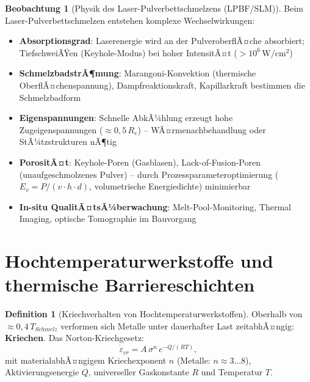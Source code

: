 ﻿\documentclass[a4paper,12pt]{report}
\theoremstyle{definition}
\newtheorem{definition}{Definition}
\newtheorem{beobachtung}{Beobachtung}
\begin{document}
\begin{beobachtung}[Physik des Laser-Pulverbettschmelzens (LPBF/SLM)]
Beim Laser-Pulverbettschmelzen entstehen komplexe Wechselwirkungen:
\begin{itemize}
    \item[-] \textbf{Absorptionsgrad}: Laserenergie wird an der PulveroberflÃ¤che
          absorbiert; TiefschweiÃŸen (Keyhole-Modus) bei hoher IntensitÃ¤t ($> 10^6\,\mathrm{W/cm^2}$)
    \item[-] \textbf{SchmelzbadstrÃ¶mung}: Marangoni-Konvektion (thermische OberflÃ¤chenspannung),
          Dampfreaktionskraft, Kapillarkraft bestimmen die Schmelzbadform
    \item[-] \textbf{Eigenspannungen}: Schnelle AbkÃ¼hlung erzeugt hohe Zugeigenspannungen
          ($\approx 0{,}5\,R_e$) -- WÃ¤rmenachbehandlung oder StÃ¼tzstrukturen nÃ¶tig
    \item[-] \textbf{PorositÃ¤t}: Keyhole-Poren (Gasblasen), Lack-of-Fusion-Poren
          (unaufgeschmolzenes Pulver) -- durch Prozessparameteroptimierung ($E_v = P/(v\cdot h\cdot d)$,
          volumetrische Energiedichte) minimierbar
    \item[-] \textbf{In-situ QualitÃ¤tsÃ¼berwachung}: Melt-Pool-Monitoring,
          Thermal Imaging, optische Tomographie im Bauvorgang
\end{itemize}
\end{beobachtung}

\section{Hochtemperaturwerkstoffe und thermische Barriereschichten}

\begin{definition}[Kriechverhalten von Hochtemperaturwerkstoffen]
Oberhalb von $\approx 0{,}4\,T_{Schmelz}$ verformen sich Metalle unter
dauerhafter Last zeitabhÃ¤ngig: \textbf{Kriechen}.
Das Norton-Kriechgesetz:
\[
  \dot{\varepsilon}_{cr} = A\,\sigma^n\,e^{-Q/(RT)},
\]
mit materialabhÃ¤ngigem Kriechexponent $n$ (Metalle: $n \approx 3\ldots8$),
Aktivierungsenergie $Q$, universeller Gaskonstante $R$ und Temperatur $T$.
\end{definition}
\end{document}
